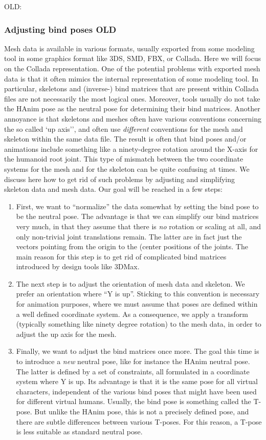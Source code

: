 OLD:


\subsubsection{Adjusting bind poses OLD}


Mesh data is available in various formats, usually exported from some modeling tool
in some graphics format like 3DS,  SMD, FBX, or Collada.
Here we will focus on the Collada representation.
One of the potential problems with exported mesh data is that it often mimics the
internal representation of some modeling tool. In particular, skeletons and (inverse-) bind matrices
that are present within Collada files are not necessarily the most logical ones.
Moreover, tools usually do not take the HAnim pose as the neutral pose for determining their bind matrices.
Another annoyance is that skeletons and meshes often have various conventions concerning
the so called `up axis'', and often use \emph{different} conventions for the mesh and skeleton
within the same data file.
The result is often that bind poses and/or animations include something like a ninety-degree rotation
around the X-axis for the humanoid root joint. This type of mismatch between the two coordinate systems
for the mesh and for the skeleton can be quite confusing at times.
We discuss here how to get rid of such problems by adjusting
and simplifying skeleton data and mesh data.
Our goal will be reached in a few steps:
%
\begin{enumerate}
\item First, we want to ``normalize'' the data somewhat by setting the bind pose to be the neutral pose.
 The advantage is that we can simplify our bind matrices very much,
 in that they assume that there is \emph{no} rotation or scaling at all,
and only non-trivial joint translations remain.
The latter are in fact just the vectors pointing from the
origin to the (center positions of the joints.
The main reason for this step is to get rid of complicated bind matrices introduced by design tools like 3DMax.
\item The next step is to adjust the orientation of mesh data and skeleton. We prefer an orientation
where ``Y is up''. Sticking to this convention is necessary for animation purposes, where we must assume that
poses are defined within a well defined coordinate system.
As a consequence, we apply a transform (typically something like ninety degree rotation) to the mesh data,
in order to adjust the up axis for the mesh.
\item Finally, we want to adjust the bind matrices once more.
The goal this time is to introduce a \emph{new} neutral pose, like for instance the HAnim neutral pose.
The latter is defined by a set of constraints, all formulated in a coordinate system where Y is up.
Its advantage is that it is the same pose for all virtual characters, independent of the various
bind poses that might have been used for different virtual humans.
Usually, the bind pose is something called the T-pose. But unlike the HAnim pose, this is
not a precisely defined pose, and there are subtle differences between various T-poses.
For this reason, a T-pose is less suitable as standard neutral pose.
\end{enumerate}
%
